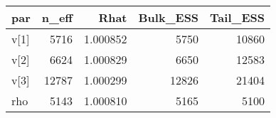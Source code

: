 \begin{table}[H]
\centering
\begin{tabular}{>{\raggedright\arraybackslash}p{1cm}rrrr}
\toprule
par & n\_eff & Rhat & Bulk\_ESS & Tail\_ESS\\
\midrule
\rowcolor{gray!6}  v[1] & 5716 & 1.000852 & 5750 & 10860\\
v[2] & 6624 & 1.000829 & 6650 & 12583\\
\rowcolor{gray!6}  v[3] & 12787 & 1.000299 & 12826 & 21404\\
rho & 5143 & 1.000810 & 5165 & 5100\\
\bottomrule
\end{tabular}
\end{table}